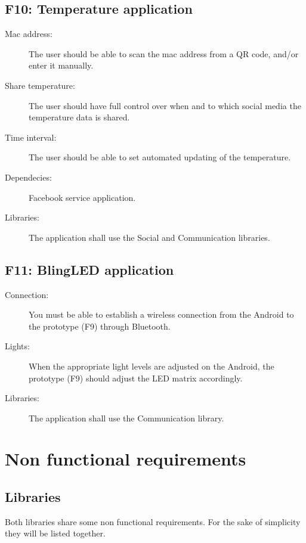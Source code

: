 \subsection{F10: Temperature application}
\begin{description}
	\item[Mac address:] The user should be able to scan the mac address from a QR code, and/or enter it manually. 
	\item[Share temperature:] The user should have full control over when and to which social media the temperature data is shared.
	\item[Time interval:] The user should be able to set automated updating of the temperature.
	\item[Dependecies:] Facebook service application.
	\item[Libraries:] The application shall use the Social and Communication libraries.
\end{description}

\subsection{F11: BlingLED application}
\begin{description}
	\item[Connection:] You must be able to establish a wireless connection from the Android to the prototype (F9) through Bluetooth.
	\item[Lights:] When the appropriate light levels are adjusted on the Android, the prototype (F9) should adjust the LED matrix accordingly.
	\item[Libraries:] The application shall use the Communication library.
\end{description}

\newpage

\section{Non functional requirements}

\subsection{Libraries}

Both libraries share some non functional requirements.
For the sake of simplicity they will be listed together.

